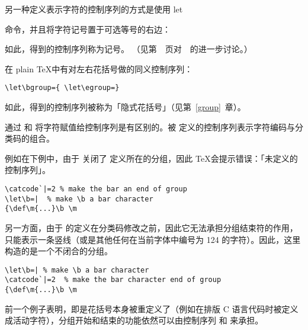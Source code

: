 \documentclass{book}
\begin{document}
另一种定义表示字符的控制序列的方式是使用 \cstoidx let\par 命令，并且将字符记号置于可选等号的右边：
\begin{disp}\end{disp}
如此，得到的控制序列称为记号。
（见第~\pageref{let}~页对~~的进一步讨论。）

在 plain \TeX 中有对左右花括号做的同义控制序列：
\begin{verbatim}
\let\bgroup={ \let\egroup=}
\end{verbatim}
如此，得到的控制序列被称为「隐式花括号」（见第~\ref{group}~章）。

通过  和  将字符赋值给控制序列是有区别的。被  定义的控制序列表示字符编码与分类码的组合。

例如在下例中，由于  关闭了  定义所在的分组，因此 \TeX 会提示错误：「未定义的控制序列」。
\begin{verbatim}
\catcode`|=2 % make the bar an end of group
\let\b=|  % make \b a bar character
{\def\m{...}\b \m
\end{verbatim}
另一方面，由于  的定义在分类码修改之前，因此它无法承担分组结束符的作用，只能表示一条竖线（或是其他任何在当前字体中编号为 124 的字符）。因此，这里构造的是一个不闭合的分组。
\begin{verbatim}
\let\b=| % make \b a bar character
\catcode`|=2  % make the bar character end of group
{\def\m{...}\b \m
\end{verbatim}
前一个例子表明，即是花括号本身被重定义了（例如在排版 C 语言代码时被定义成活动字符），分组开始和结束的功能依然可以由控制序列  和  来承担。
\end{document}
